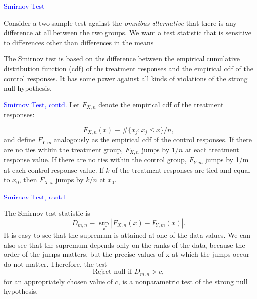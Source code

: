 \documentclass[landscape]{slides}
\newcommand{\beq}{\begin{equation}}
\newcommand{\eeq}{\end{equation}}
\begin{document}
\begin{slide}
\begin{slide}
\end{slide}

\begin{slide}
{\textcolor{blue}{Smirnov Test}}

Consider a two-sample test against the {\em omnibus alternative\/} that there is
any difference at all between the two groups.
We want a test statistic that is sensitive to differences other than differences
in the means.

    The Smirnov test is based on the difference between the
    empirical cumulative distribution function (cdf) of the treatment responses
    and the empirical cdf of the control responses.
    It has some power against all kinds of violations of the strong null hypothesis.

\end{slide}

\begin{slide}
{\textcolor{blue}{Smirnov Test, contd.}}
    Let $F_{X,n}$  denote the empirical cdf of the treatment responses:

\beq
    F_{X,n}(x)
    \equiv \#\{ x_j: x_j \le x \}/n,
\eeq
    and define $F_{Y,m}$ analogously as the empirical cdf of the
    control responses.
    If there are no ties within the treatment group, $F_{X,n}$
    jumps by $1/n$ at each treatment response value.
    If there are no ties within the control group,
    $F_{Y,m}$ jumps by 1/m at each control response value.
    If $k$ of the treatment responses are tied and
    equal to $x_0$, then $F_{X,n}$ jumps by $k/n$
    at $x_0$.
\end{slide}

\begin{slide}
{\textcolor{blue}{Smirnov Test, contd.}}

    The Smirnov test statistic is
\beq
    D_{m,n} \equiv \sup_x | F_{X,n}(x) - F_{Y,m}(x) |.
\eeq
    It is easy to see that the supremum is attained at one of the data values.
    We can also see that
    the supremum depends only on the ranks of the data, because the
    order of the jumps matters, but the precise values of x at which the jumps occur
    do not matter.
    Therefore, the test
\beq
    \mbox{Reject null if } D_{m,n} > c,
\eeq
    for an appropriately chosen value of $c$, is a nonparametric test of
    the strong null hypothesis.


\end{slide}
\end{slide}
\end{document}
